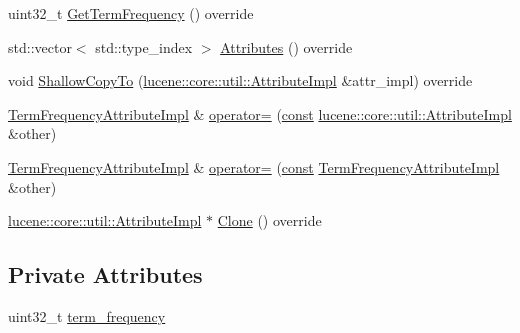 \begin{DoxyCompactItemize}
\item 
uint32\+\_\+t \mbox{\hyperlink{classlucene_1_1core_1_1analysis_1_1tokenattributes_1_1TermFrequencyAttributeImpl_adfd47f9d692a2fbe7a48d590f8c585cb}{Get\+Term\+Frequency}} () override
\item 
std\+::vector$<$ std\+::type\+\_\+index $>$ \mbox{\hyperlink{classlucene_1_1core_1_1analysis_1_1tokenattributes_1_1TermFrequencyAttributeImpl_a02e08b89bd1105326aff4d578c759886}{Attributes}} () override
\item 
void \mbox{\hyperlink{classlucene_1_1core_1_1analysis_1_1tokenattributes_1_1TermFrequencyAttributeImpl_a82c1cb2877fab77b907b4b03795d0fdf}{Shallow\+Copy\+To}} (\mbox{\hyperlink{classlucene_1_1core_1_1util_1_1AttributeImpl}{lucene\+::core\+::util\+::\+Attribute\+Impl}} \&attr\+\_\+impl) override
\item 
\mbox{\hyperlink{classlucene_1_1core_1_1analysis_1_1tokenattributes_1_1TermFrequencyAttributeImpl}{Term\+Frequency\+Attribute\+Impl}} \& \mbox{\hyperlink{classlucene_1_1core_1_1analysis_1_1tokenattributes_1_1TermFrequencyAttributeImpl_a855437532aa60208023e367fe09926fd}{operator=}} (\mbox{\hyperlink{ZlibCrc32_8h_a2c212835823e3c54a8ab6d95c652660e}{const}} \mbox{\hyperlink{classlucene_1_1core_1_1util_1_1AttributeImpl}{lucene\+::core\+::util\+::\+Attribute\+Impl}} \&other)
\item 
\mbox{\hyperlink{classlucene_1_1core_1_1analysis_1_1tokenattributes_1_1TermFrequencyAttributeImpl}{Term\+Frequency\+Attribute\+Impl}} \& \mbox{\hyperlink{classlucene_1_1core_1_1analysis_1_1tokenattributes_1_1TermFrequencyAttributeImpl_afb31133bdba35cd3e19bbe1aefed9908}{operator=}} (\mbox{\hyperlink{ZlibCrc32_8h_a2c212835823e3c54a8ab6d95c652660e}{const}} \mbox{\hyperlink{classlucene_1_1core_1_1analysis_1_1tokenattributes_1_1TermFrequencyAttributeImpl}{Term\+Frequency\+Attribute\+Impl}} \&other)
\item 
\mbox{\hyperlink{classlucene_1_1core_1_1util_1_1AttributeImpl}{lucene\+::core\+::util\+::\+Attribute\+Impl}} $\ast$ \mbox{\hyperlink{classlucene_1_1core_1_1analysis_1_1tokenattributes_1_1TermFrequencyAttributeImpl_a3d973d479d147e3feece05c9988bc7c6}{Clone}} () override
\end{DoxyCompactItemize}
\subsection*{Private Attributes}
\begin{DoxyCompactItemize}
\item 
uint32\+\_\+t \mbox{\hyperlink{classlucene_1_1core_1_1analysis_1_1tokenattributes_1_1TermFrequencyAttributeImpl_a94d743632e8edd5e9e05ce039eec16e8}{term\+\_\+frequency}}
\end{DoxyCompactItemize}
